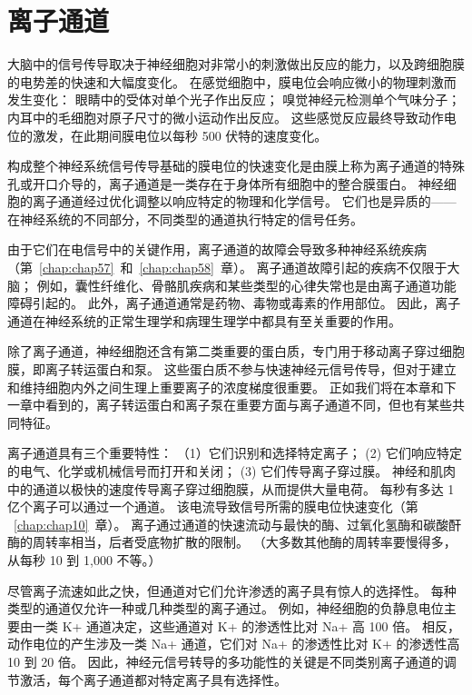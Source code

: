 \chapter{离子通道} \label{chap:chap8}

大脑中的信号传导取决于神经细胞对非常小的刺激做出反应的能力，以及跨细胞膜的电势差的快速和大幅度变化。 
在感觉细胞中，膜电位会响应微小的物理刺激而发生变化：
眼睛中的受体对单个光子作出反应；
嗅觉神经元检测单个气味分子；
内耳中的毛细胞对原子尺寸的微小运动作出反应。
这些感觉反应最终导致动作电位的激发，在此期间膜电位以每秒 500 伏特的速度变化。


构成整个神经系统信号传导基础的膜电位的快速变化是由膜上称为离子通道的特殊孔或开口介导的，离子通道是一类存在于身体所有细胞中的整合膜蛋白。
神经细胞的离子通道经过优化调整以响应特定的物理和化学信号。
它们也是异质的——在神经系统的不同部分，不同类型的通道执行特定的信号任务。


由于它们在电信号中的关键作用，离子通道的故障会导致多种神经系统疾病（第~\ref{chap:chap57}~和~\ref{chap:chap58}~章）。
离子通道故障引起的疾病不仅限于大脑；
例如，囊性纤维化、骨骼肌疾病和某些类型的心律失常也是由离子通道功能障碍引起的。
此外，离子通道通常是药物、毒物或毒素的作用部位。
因此，离子通道在神经系统的正常生理学和病理生理学中都具有至关重要的作用。


除了离子通道，神经细胞还含有第二类重要的蛋白质，专门用于移动离子穿过细胞膜，即离子转运蛋白和泵。
这些蛋白质不参与快速神经元信号传导，但对于建立和维持细胞内外之间生理上重要离子的浓度梯度很重要。
正如我们将在本章和下一章中看到的，离子转运蛋白和离子泵在重要方面与离子通道不同，但也有某些共同特征。


离子通道具有三个重要特性：
（1）它们识别和选择特定离子；
(2) 它们响应特定的电气、化学或机械信号而打开和关闭；
(3) 它们传导离子穿过膜。
神经和肌肉中的通道以极快的速度传导离子穿过细胞膜，从而提供大量电荷。
每秒有多达 1 亿个离子可以通过一个通道。
该电流导致信号所需的膜电位快速变化（第 ~\ref{chap:chap10}~章）。
离子通过通道的快速流动与最快的酶、过氧化氢酶和碳酸酐酶的周转率相当，后者受底物扩散的限制。
（大多数其他酶的周转率要慢得多，从每秒 10 到 1,000 不等。）


尽管离子流速如此之快，但通道对它们允许渗透的离子具有惊人的选择性。
每种类型的通道仅允许一种或几种类型的离子通过。
例如，神经细胞的负静息电位主要由一类 K+ 通道决定，这些通道对 K+ 的渗透性比对 Na+ 高 100 倍。
相反，动作电位的产生涉及一类 Na+ 通道，它们对 Na+ 的渗透性比对 K+ 的渗透性高 10 到 20 倍。
因此，神经元信号转导的多功能性的关键是不同类别离子通道的调节激活，每个离子通道都对特定离子具有选择性。


